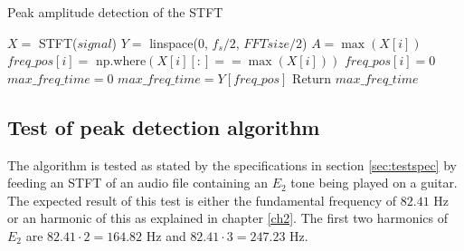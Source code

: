\begin{algorithm}[H]
\caption{Peak amplitude detection of the STFT}
\label{alg:Pak}
\begin{algorithmic}[1]
\State  $X =$ STFT($signal$) 
\State $Y =$ linspace($0$, $f_s/2$, $FFTsize/2$) 
		\State $A = \max(X[i])$ 
		 
			\State $freq\_pos[i] = $ np.where$(X[i][:] == \max(X[i]))$ 
		\Else
			\State $freq\_pos[i] = 0$	
		\EndIf
			\State $max\_freq\_time = 0$
		\Else
			\State $max\_freq\_time = Y[freq\_pos]$
		\EndIf
	\EndFor
	\State Return $max\_freq\_time$
\EndProcedure
\end{algorithmic}
\end{algorithm}

\subsection{Test of peak detection algorithm}
The algorithm is tested as stated by the specifications in section \ref{sec:testspec} by feeding an STFT of an audio file containing an $E_2$ tone being played on a guitar.
The expected result of this test is either the fundamental frequency of $82.41$ Hz or an harmonic of this as explained in chapter \ref{ch2}. The first two harmonics of $E_2$ are $82.41 \cdot 2 = 164.82$ Hz and $82.41 \cdot 3 = 247.23$ Hz.

